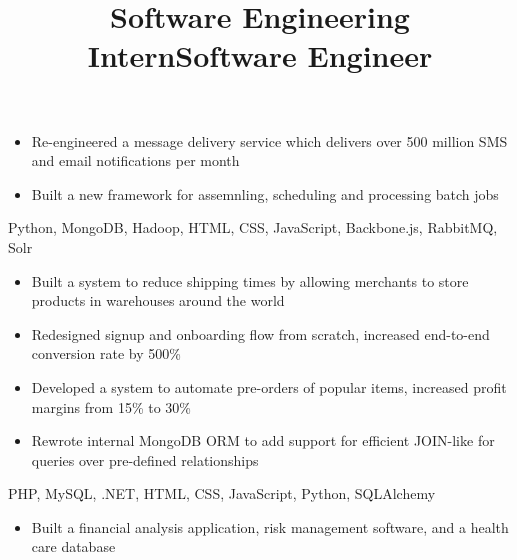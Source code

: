 \documentclass[]{res}
\begin{document}
\begin{resume}
\begin{position}
\begin{description}
    \end{description}
    \begin{itemize}
      \item Re-engineered a message delivery service which delivers over 500 million
        SMS and email notifications per month
      \item Built a new framework for assemnling, scheduling and processing batch jobs
    \end{itemize}
  \end{position}
  \title{Software Engineering Intern}
  \begin{position}
    \begin{description}
      \item Python, MongoDB, Hadoop, HTML, CSS, JavaScript, Backbone.js, RabbitMQ, Solr
    \end{description}
    \begin{itemize}
      \item Built a system to reduce shipping times by allowing merchants to store products in warehouses
        around the world
      \item Redesigned signup and onboarding flow from scratch, increased end-to-end conversion rate by 500\%
      \item Developed a system to automate pre-orders of popular items, increased profit margins from 15\% to 30\%
      \item Rewrote internal MongoDB ORM to add support for efficient JOIN-like for queries over pre-defined relationships
    \end{itemize}
  \end{position}
  \title{Software Engineer}
  \begin{position}
    \begin{description}
      \item PHP, MySQL, .NET, HTML, CSS, JavaScript, Python, SQLAlchemy
    \end{description}
    \begin{itemize}
      \item Built a financial analysis application, risk management software, and a health care database
    \end{itemize}
  \end{position}


\end{resume}
\end{document}

